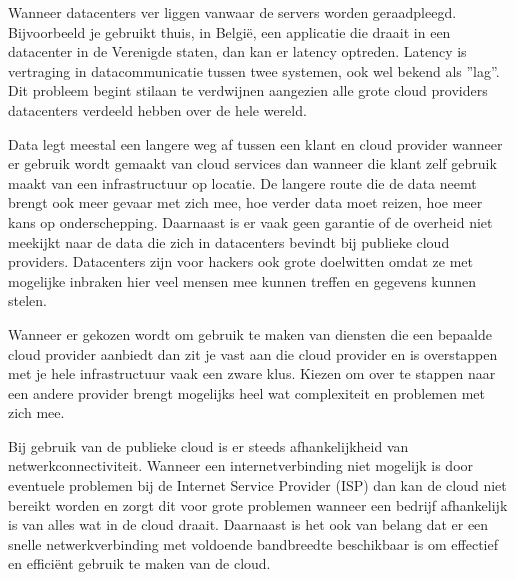 \begin{description}[style=unboxed, labelwidth=\linewidth, listparindent =0pt]
        \item[Latency]
        Wanneer datacenters ver liggen vanwaar de servers worden geraadpleegd. Bijvoorbeeld je gebruikt thuis, in België, een applicatie die draait in een datacenter in de Verenigde staten, dan kan er latency optreden. Latency is vertraging in datacommunicatie tussen twee systemen, ook wel bekend als ''lag''. Dit probleem begint stilaan te verdwijnen aangezien alle grote cloud providers datacenters verdeeld hebben over de hele wereld.
        \newline
        
        \item[Privacy en security]
        Data legt meestal een langere weg af tussen een klant en cloud provider wanneer er gebruik wordt gemaakt van cloud services dan wanneer die klant zelf gebruik maakt van een infrastructuur op locatie. De langere route die de data neemt brengt ook meer gevaar met zich mee, hoe verder data moet reizen, hoe meer kans op onderschepping. Daarnaast is er vaak geen garantie of de overheid niet meekijkt naar de data die zich in datacenters bevindt bij publieke cloud providers. Datacenters zijn voor hackers ook grote doelwitten omdat ze met mogelijke inbraken hier veel mensen mee kunnen treffen en gegevens kunnen stelen.
        \newline
        
        \item [Vendor lock-in]
        Wanneer er gekozen wordt om gebruik te maken van diensten die een bepaalde cloud provider aanbiedt dan zit je vast aan die cloud provider en is overstappen met je hele infrastructuur vaak een zware klus. Kiezen om over te stappen naar een andere provider brengt mogelijks heel wat complexiteit en problemen met zich mee.
        \newline
        
        
        \item [Afhankelijk van netwerkconnectiviteit]
        Bij gebruik van de publieke cloud is er steeds afhankelijkheid van netwerkconnectiviteit. Wanneer een internetverbinding niet mogelijk is door eventuele problemen bij de Internet Service Provider (ISP) dan kan de cloud niet bereikt worden en zorgt dit voor grote problemen wanneer een bedrijf afhankelijk is van alles wat in de cloud draait. Daarnaast is het ook van belang dat er een snelle netwerkverbinding met voldoende bandbreedte beschikbaar is om effectief en efficiënt gebruik te maken van de cloud.
        \newline
        

\end{description}
